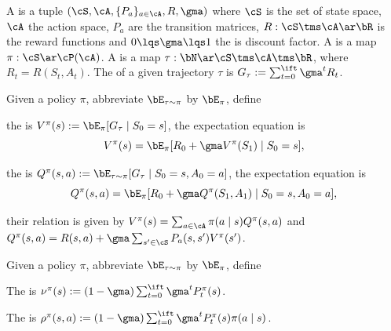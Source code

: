 \documentclass[article, a4paper, twoside]{universal}
\begin{document}
\confighead{}{}{}





\begin{dfn}
    A  is a tuple $(\cS,\cA,\{P_{a}\}_{a\in\cA},R,\gma)$ where $\cS$ is the set of state space, $\cA$ the action space, $P_{a}$ are the transition matrices, $R:\cS\tms\cA\ar\bR$ is the reward functions and $0\lqs\gma\lqs1$ the is discount factor. A  is a map $\pi:\cS\ar\cP(\cA)$. A  is a map $\tau:\bN\ar\cS\tms\cA\tms\bR$, where $R_{t}=R(S_{t},A_{t})$. The  of a given trajectory $\tau$ is $G_{\tau}:=\sum_{t=0}^{\ift}\gma^{t}R_{t}$.
\end{dfn}

\begin{dfn}
    Given a policy $\pi$, abbreviate $\bE_{\tau\sim\pi}$ by $\bE_{\pi}$, define
    \begin{itm}
        \item the  is $V^{\pi}(s):=\bE_{\pi}[G_{\tau}\mid S_{0}=s]$, the expectation equation is
        \[
            V^{\pi}(s)=\bE_{\pi}[R_{0}+\gma V^{\pi}(S_{1})\mid S_{0}=s],
        \]
        \item the  is $Q^{\pi}(s,a):=\bE_{\tau\sim\pi}[G_{\tau}\mid S_{0}=s, A_{0}=a]$, the expectation equation is
        \[
            Q^{\pi}(s,a)=\bE_{\pi}[R_{0}+\gma Q^{\pi}(S_{1},A_{1})\mid S_{0}=s,A_{0}=a],
        \]
    \end{itm}
    their relation is given by $V^{\pi}(s)=\sum_{a\in\cA}\pi(a\mid s)Q^{\pi}(s,a)$ and $Q^{\pi}(s,a)=R(s,a)+\gma\sum_{s'\in\cS}P_{a}(s,s')V^{\pi}(s')$.
\end{dfn}

\begin{dfn}
    Given a policy $\pi$, abbreviate $\bE_{\tau\sim\pi}$ by $\bE_{\pi}$, define
    \begin{itm}
        \item The  is $\nu^{\pi}(s):=(1-\gma)\sum_{t=0}^{\ift}\gma^{t}P_{t}^{\pi}(s)$.
        \item The  is $\rho^{\pi}(s,a):=(1-\gma)\sum_{t=0}^{\ift}\gma^{t}P_{t}^{\pi}(s)\pi(a\mid s)$.
    \end{itm}
\end{dfn}
\end{document}
